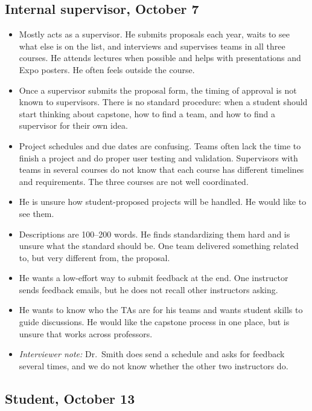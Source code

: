 \documentclass{article}
\begin{document}
    \subsection{Internal supervisor, October 7}
    \label{int:IS-1}

    \begin{itemize}
        \item Mostly acts as a supervisor. He submits proposals each year, waits to see what else is on the list,
        and interviews and supervises teams in all three courses. He attends lectures when possible and helps
        with presentations and Expo posters. He often feels outside the course.
        \item Once a supervisor submits the proposal form, the timing of approval is not known to supervisors.
        There is no standard procedure: when a student should start thinking about capstone, how to
        find a team, and how to find a supervisor for their own idea.
        \item Project schedules and due dates are confusing. Teams often lack the time to finish a project and do
        proper user testing and validation. Supervisors with teams in several courses do not know that
        each course has different timelines and requirements. The three courses are not well coordinated.
        \item He is unsure how student-proposed projects will be handled. He would like to see them.
        \item Descriptions are 100--200 words. He finds standardizing them hard and is unsure what the standard
        should be. One team delivered something related to, but very different from, the proposal.
        \item He wants a low-effort way to submit feedback at the end. One instructor sends feedback emails,
        but he does not recall other instructors asking.
        \item He wants to know who the TAs are for his teams and wants student skills to guide discussions.
        He would like the capstone process in one place, but is unsure that works across professors.
        \item \emph{Interviewer note:} Dr.~Smith does send a schedule and asks for feedback several times,
        and we do not know whether the other two instructors do.
    \end{itemize}

    \subsection{Student, October 13}
    \label{int:S-1}
\end{document}
